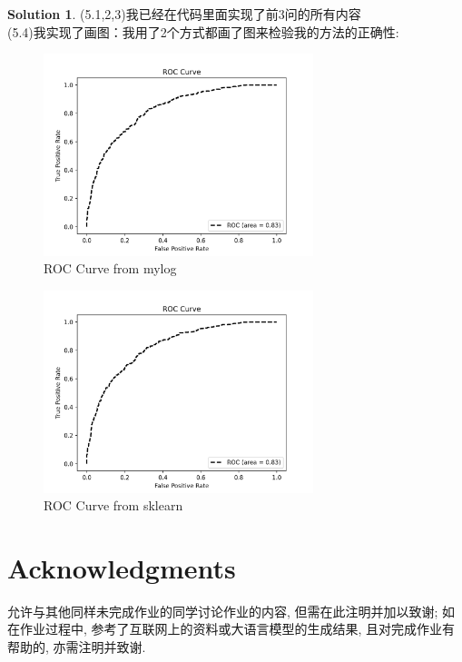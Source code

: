 \documentclass[a4paper,UTF8]{article}
\numberwithin{equation}{section}
\theoremstyle{definition}
\newtheorem*{solution}{Solution}
\begin{document}
\begin{solution}
    (5.1,2,3)我已经在代码里面实现了前3问的所有内容\\
    (5.4)我实现了画图：我用了2个方式都画了图来检验我的方法的正确性:
    \begin{figure}[H]
        \centering
        \includegraphics[width=0.7\textwidth]{roc_mylog.png}
        \caption{ROC Curve from mylog}
        \label{fig:roc}
    \end{figure}
    \begin{figure}[H]
        \centering
        \includegraphics[width=0.7\textwidth]{roc_sklearn.png}
        \caption{ROC Curve from sklearn}
        \label{fig:roc1}
    \end{figure}
\end{solution}


\newpage
\section*{Acknowledgments}
允许与其他同样未完成作业的同学讨论作业的内容, 但需在此注明并加以致谢; 如在作业过程中, 参考了互联网上的资料或大语言模型的生成结果, 且对完成作业有帮助的, 亦需注明并致谢.
\end{document}
